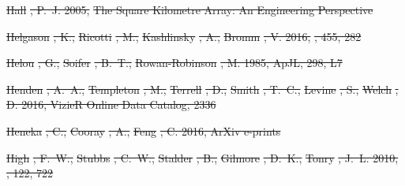 \documentclass[numberedappendix]{emulateapj}
\providecommand{\DIFdel}[1]{{\protect\color{red}\sout{#1}}}                      %
\begin{document}
\DIFdel{Hall}%
\DIFdel{, P.~J. 2005, }%
\DIFdel{The Square Kilometre Array: An Engineering Perspective}%

\DIFdel{Helgason}%
\DIFdel{, K., }%
\DIFdel{Ricotti}%
\DIFdel{, M., }%
\DIFdel{Kashlinsky}%
\DIFdel{, A., }%
\DIFdel{Bromm}%
\DIFdel{, V. 2016, }%
\DIFdel{,
  455, 282
}%

\DIFdel{Helou}%
\DIFdel{, G., }%
\DIFdel{Soifer}%
\DIFdel{, B.~T., }%
\DIFdel{Rowan-Robinson}%
\DIFdel{, M. 1985, ApJL, 298, L7
}%

\DIFdel{Henden}%
\DIFdel{, A.~A., }%
\DIFdel{Templeton}%
\DIFdel{, M., }%
\DIFdel{Terrell}%
\DIFdel{, D., }%
\DIFdel{Smith}%
\DIFdel{, T.~C., }%
\DIFdel{Levine}%
\DIFdel{, S.,
  }%
\DIFdel{Welch}%
\DIFdel{, D. 2016, VizieR Online Data Catalog, 2336
}%

\DIFdel{Heneka}%
\DIFdel{, C., }%
\DIFdel{Cooray}%
\DIFdel{, A., }%
\DIFdel{Feng}%
\DIFdel{, C. 2016, ArXiv e-prints
}%

\DIFdel{High}%
\DIFdel{, F.~W., }%
\DIFdel{Stubbs}%
\DIFdel{, C.~W., }%
\DIFdel{Stalder}%
\DIFdel{, B., }%
\DIFdel{Gilmore}%
\DIFdel{, D.~K., }%
\DIFdel{Tonry}%
\DIFdel{,
  J.~L. 2010, }%
\DIFdel{, 122, 722
}%
\end{document}
